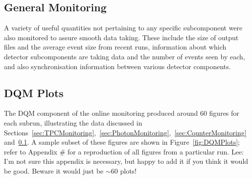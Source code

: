 \subsection{General Monitoring}\label{sec:GeneralMonitoring}

A variety of useful quantities not pertaining to any specific subcomponent were also monitored to assure smooth data taking.  These include the size of output files and the average event size from recent runs, information about which detector subcomponents are taking data and the number of events seen by each, and also synchronisation information between various detector components.

\subsection{DQM Plots}\label{sec:DQMPlots}

The DQM component of the online monitoring produced around 60 figures for each subrun, illustrating the data discussed in Sections~\ref{sec:TPCMonitoring},~\ref{sec:PhotonMonitoring},~\ref{sec:CounterMonitoring} and~\ref{sec:GeneralMonitoring}.  A sample subset of these figures are shown in Figure~\ref{fig:DQMPlots}; refer to Appendix \# for a reproduction of all figures from a particular run. {\color{red} Lee: I'm not sure this appendix is necessary, but happy to add it if you think it would be good.  Beware it would just be $\sim$60 plots!}

